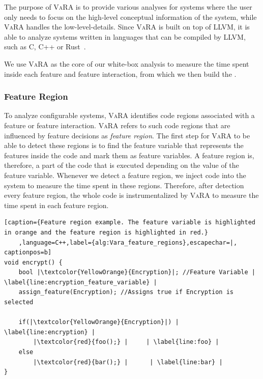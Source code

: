 The purpose of \textsc{VaRA} is to provide various analyses for systems where the user only needs to focus on the high-level conceptual information of the 
system, while \textsc{VaRA} handles the low-level-details. 
Since \textsc{VaRA} is built on top of \textsc{LLVM}, it is able to analyze systems written in languages that can be compiled by \textsc{LLVM}, such as C, C++ or Rust~\cite{VaRA-Flo}.

We use \textsc{VaRA} as the core of our white-box analysis to measure the time spent inside each feature and feature interaction, from which we then build the {\perfInfluenceModel}.  

\subsubsection{Feature Region}
To analyze configurable systems, \textsc{VaRA} identifies code regions associated with a feature or feature interaction.
\textsc{VaRA} refers to such code regions that are influenced by feature decisions as \emph{feature region}. 
The first step for \textsc{VaRA} to be able to detect these regions is to find the feature variable that represents the features inside the code and mark them as
feature variables. 
A feature region is, therefore, a part of the code that is executed depending on the value of the feature variable. Whenever we detect a feature region,
we inject code into the system to measure the time spent in these regions. Therefore, after detection every feature region, the whole code is instrumentalized
by \textsc{VaRA} to measure the time spent in each feature region. 

\lstset{style=myStyle}
\begin{minipage}{\linewidth}
\begin{lstlisting}[caption={Feature region example. The feature variable is highlighted in orange and the feature region is highlighted in red.}
    ,language=C++,label={alg:Vara_feature_regions},escapechar=|, captionpos=b]
void encrypt() {
    bool |\textcolor{YellowOrange}{Encryption}|; //Feature Variable | \label{line:encryption_feature_variable} |
    assign_feature(Encryption); //Assigns true if Encryption is selected
    
    if(|\textcolor{YellowOrange}{Encryption}|) | \label{line:encryption} |
        |\textcolor{red}{foo();} |     | \label{line:foo} |
    else
        |\textcolor{red}{bar();} |      | \label{line:bar} |
}
\end{lstlisting}
\end{minipage}

